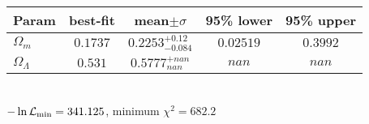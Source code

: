 \begin{tabular}{|l|c|c|c|c|} 
 \hline 
Param & best-fit & mean$\pm\sigma$ & 95\% lower & 95\% upper \\ \hline 
$\Omega_{m }$ &$0.1737$ & $0.2253_{-0.084}^{+0.12}$ & $0.02519$ & $0.3992$ \\ 
$\Omega_{\Lambda }$ &$0.531$ & $0.5777_{nan}^{+nan}$ & $nan$ & $nan$ \\ 
\hline 
 \end{tabular} \\ 
$-\ln{\cal L}_\mathrm{min} =341.125$, minimum $\chi^2=682.2$ \\ 
